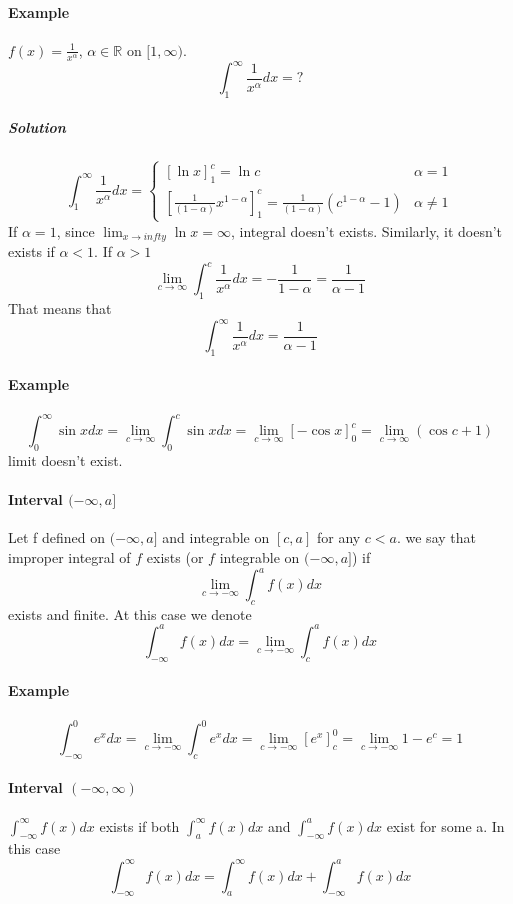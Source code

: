 \paragraph{Example}
$f(x) = \frac{1}{x^\alpha}$, $\alpha \in \mathbb{R}$ on $[1, \infty)$.
$$\int_1^\infty \frac{1}{x^\alpha} dx = ?$$
\subparagraph{Solution}
$$\int_1^\infty \frac{1}{x^\alpha} dx = \begin{cases}
[\ln x]_1^c = \ln c &\alpha = 1 \\
\left[\frac{1}{(1-\alpha)}x^{1-\alpha}\right]_1^c = \frac{1}{(1-\alpha)}\left(c^{1-\alpha}-1\right) & \alpha \neq 1
\end{cases}$$
If $\alpha = 1$, since $\lim_{x \to infty} \ln x  = \infty$, integral doesn't exists.
Similarly, it doesn't exists if $\alpha < 1$.
If $\alpha > 1$
$$\lim_{c \to \infty} \int_1^c \frac{1}{x^\alpha} dx = - \frac{1}{1-\alpha} = \frac{1}{\alpha - 1}$$
That means that
$$\int_1^\infty \frac{1}{x^\alpha} dx = \frac{1}{\alpha -1}$$
\paragraph{Example}
$$\int_0^\infty \sin x dx = \lim_{c \to \infty} \int_0^c \sin x dx = \lim_{c \to \infty} \left[-\cos x \right]_0^c =  \lim_{c \to \infty} \left( \cos c + 1 \right)$$
limit doesn't exist.

\paragraph{Interval $(-\infty,a]$}

Let f defined on $(-\infty,a]$ and integrable on $[c,a]$ for any $c<a$. we say that improper integral of $f$ exists (or $f$ integrable on  $(-\infty,a]$) if $$\lim_{c\to -\infty} \int_c^a f(x) dx$$ exists and finite. At this case we denote $$\int_{-\infty}^a f(x) dx = \lim_{c\to -\infty} \int_c^a f(x) dx$$
\paragraph{Example}
$$\int_{-\infty}^{0} e^x dx = \lim_{c \to -\infty} \int_{c}^{0} e^x dx = \lim_{c \to -\infty}  \left[ e^x \right]_c^0 = \lim_{c \to -\infty}  1 - e^c = 1$$


\paragraph{Interval $(-\infty,\infty)$}

$\int_{-\infty}^{\infty} f(x) dx$ exists if both $\int_{a}^{\infty} f(x) dx$  and $\int_{-\infty}^{a} f(x) dx$  exist for some a. In this case
$$\int_{-\infty}^{\infty} f(x) dx = \int_{a}^{\infty} f(x) dx + \int_{-\infty}^{a} f(x) dx$$
